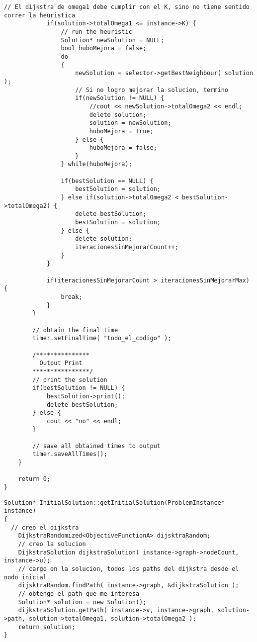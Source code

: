\begin{lstlisting}[caption=grasp.cpp]
            // El dijkstra de omega1 debe cumplir con el K, sino no tiene sentido correr la heuristica            
            if(solution->totalOmega1 <= instance->K) {                               
                // run the heuristic
                Solution* newSolution = NULL;    
                bool huboMejora = false;
                do
                {                                        
                    newSolution = selector->getBestNeighbour( solution );                                                            
                    // Si no logro mejorar la solucion, termino      
                    if(newSolution != NULL) {                        
                        //cout << newSolution->totalOmega2 << endl; 
                        delete solution;
                        solution = newSolution;          
                        huboMejora = true;                          
                    } else {                      
                        huboMejora = false;
                    }        
                } while(huboMejora);

                if(bestSolution == NULL) {
                    bestSolution = solution;
                } else if(solution->totalOmega2 < bestSolution->totalOmega2) {
                    delete bestSolution;
                    bestSolution = solution;
                } else {
                    delete solution;
                    iteracionesSinMejorarCount++;      
                }            
            }       

            if(iteracionesSinMejorarCount > iteracionesSinMejorarMax) {      
                break;
            }
        }  

        // obtain the final time
        timer.setFinalTime( "todo_el_codigo" );

        /***************
          Output Print
        ****************/
        // print the solution
        if(bestSolution != NULL) {
            bestSolution->print();
            delete bestSolution;
        } else {
            cout << "no" << endl;
        }    
        
        // save all obtained times to output
        timer.saveAllTimes();
    }    
    
    return 0;
}
\end{lstlisting}
\begin{lstlisting}[caption=InitialSolution::getInitialSolution()]
Solution* InitialSolution::getInitialSolution(ProblemInstance* instance)
{    
  // creo el dijkstra
    DijkstraRandomized<ObjectiveFunctionA> dijsktraRandom;
    // creo la solucion
    DijkstraSolution dijkstraSolution( instance->graph->nodeCount, instance->u);
    // cargo en la solucion, todos los paths del dijkstra desde el nodo inicial
    dijsktraRandom.findPath( instance->graph, &dijkstraSolution );
    // obtengo el path que me interesa
    Solution* solution = new Solution();    
    dijkstraSolution.getPath( instance->v, instance->graph, solution->path, solution->totalOmega1, solution->totalOmega2 );
    return solution;
}
\end{lstlisting}

